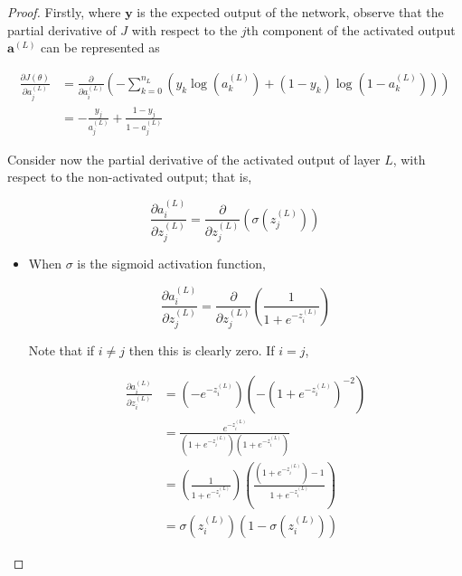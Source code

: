 \documentclass{article}
\begin{document}
        
        \begin{proof}
            
            Firstly, where $\mathbf{y}$ is the expected output of the network, observe that the partial derivative of $J$ with respect to the $j$th component of the activated output $\mathbf{a}^{(L)}$ can be represented as
                    
            $$ \begin{aligned}
            \frac{\partial J(\theta)}{\partial a^{(L)}_j}
            &= \frac{\partial}{\partial a^{(L)}_i} \left( - \sum_{k=0}^{n_L} \left( y_k \log(a^{(L)}_k) + (1 - y_k) \log(1 - a^{(L)}_k) \right) \right) \\
            &= - \frac{y_j}{a^{(L)}_j} + \frac{1 - y_j}{1 - a^{(L)}_j}
            \end{aligned} $$
            
            Consider now the partial derivative of the activated output of layer $L$, with respect to the non-activated output; that is,
            
            $$
            \frac{\partial a^{(L)}_i}{\partial z^{(L)}_j} = \frac{\partial}{\partial z^{(L)}_j} \left( \sigma(z^{(L)}_j) \right)
            $$
            
             
            \begin{itemize}
                
                \item When $\sigma$ is the sigmoid activation function,
            
                $$
                \frac{\partial a^{(L)}_i}{\partial z^{(L)}_j} = \frac{\partial}{\partial z^{(L)}_j} \left( \frac{1}{1 + e^{-z^{(L)}_i}} \right)
                $$
                
                Note that if $i \neq j$ then this is clearly zero. If $i = j$,
                
                $$ \begin{aligned}
                \frac{\partial a^{(L)}_i}{\partial z^{(L)}_i}
                &= \left( - e^{-z^{(L)}_i} \right) \left( - \left( 1 + e^{-z^{(L)}_i} \right)^{-2} \right) \\
                &= \frac{e^{-z^{(L)}_i}}{\left( 1 + e^{-z^{(L)}_i} \right) \left( 1 + e^{-z^{(L)}_i} \right)} \\
                &= \left( \frac{1}{1 + e^{-z^{(L)}_i}} \right) \left( \frac{\left( 1 + e^{-z^{(L)}_i} \right) - 1}{1 + e^{-z^{(L)}_i}} \right) \\
                &= \sigma(z^{(L)}_i) \left( 1 - \sigma(z^{(L)}_i) \right)
                \end{aligned} $$
                

\end{itemize}
\end{proof}
\end{document}
